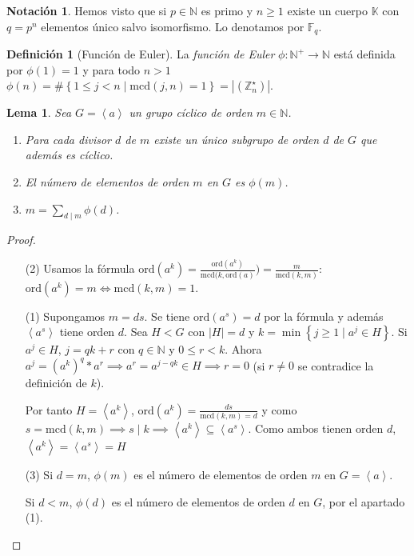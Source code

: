 \documentclass[10pt, spanish]{report}
\newtheorem*{lema}{Lema}
\theoremstyle{definition}
\newtheorem*{defin}{Definición}
\newtheorem*{notacion}{Notación}
\newcommand{\N}{\mathbb{N}}
\newcommand{\Z}{\mathbb{Z}}
\newcommand{\F}{\mathbb{F}}
\newcommand{\K}{\mathbb{K}}
\newcommand{\ord}[1]{\text{ord}(#1)}
\newcommand{\mcd}[1]{\text{mcd}(#1)}
\renewcommand{\geq}{\geqslant}
\renewcommand{\leq}{\leqslant}
\newcommand{\fecha}[1]{\marginpar{\underline{#1}}}
\begin{document}
\fecha{16/03} %

\begin{notacion}
    Hemos visto que si $p\in\N$  es primo y $n\geq1$ existe un cuerpo $\K$ con
    $q=p^n$ elementos único salvo isomorfismo. Lo denotamos por $\F_q$.
\end{notacion}

\begin{defin}[Función de Euler]
    La \textit{función de Euler} $\phi:\N^+\to\N$ está definida por $\phi(1)=1$
    y para todo $n>1$ $\phi(n)=\#\left\{1\leq j<n\mid \text{mcd}(j,n)=1\right\}=
    \left| \left( \Z_n^\star \right)\right|$.
\end{defin}

\begin{lema}
    Sea $G=\left< a \right> $  un grupo cíclico de orden $m\in\N$.
    \begin{enumerate}
        \item  Para cada divisor $d$ de $m$ existe un único subgrupo de orden
            $d$ de $G$ que además es cíclico.
        \item El número de elementos de orden $m$ en $G$ es $\phi(m)$.
        \item $m=\sum_{d\mid m}\phi(d)$.
    \end{enumerate}
\end{lema}

\begin{proof}\hspace{0pt}
    \begin{enumerate}
        \item[(2)] Usamos la fórmula
            $\ord{a^k}=\frac{\ord{a^k}}{\text{mcd}(k,
                \ord{a}})=\frac{m}{\mcd{k,m}}$:
                $\ord{a^k}=m\Leftrightarrow\mcd{k,m}=1$.
            \item[(1)] Supongamos $m=ds$. Se tiene $\ord{a^s}=d$ por la fórmula
                y además $\left< a^s \right> $ tiene orden $d$.
                Sea $H<G$ con $\left|H\right|=d$ y $k=\min\left\{ j\geq1\mid
                a^j\in H \right\}$. Si $a^j\in H$, $j=qk+r$ con $q\in\N$ y
                $0\leq r<k$. Ahora $a^j=(a^k)^q*a^r\implies a^r=a^{j-qk}\in
                H\implies r=0$ (si $r\neq0$ se contradice la definición de
                $k$).

                Por tanto $H= \left< a^k \right>$,
                $\ord{a^k}=\frac{ds}{\mcd{k,m}=d}$ y como $s=\mcd{k,m}\implies
                s\mid k\implies \left<a^k\right>\subseteq \left< a^s\right>$.
                Como ambos tienen orden $d$, $\left<a^k\right>=\left<a^s\right> =H$
            \item[(3)] Si $d=m$, $\phi(m)$ es el número de elementos de orden
                $m$ en $G=\left<a\right>$.

                Si $d<m$, $\phi(d)$ es el número de elementos de orden $d$ en
                $G$, por el apartado (1).
    \end{enumerate}
\end{proof}
\end{document}
